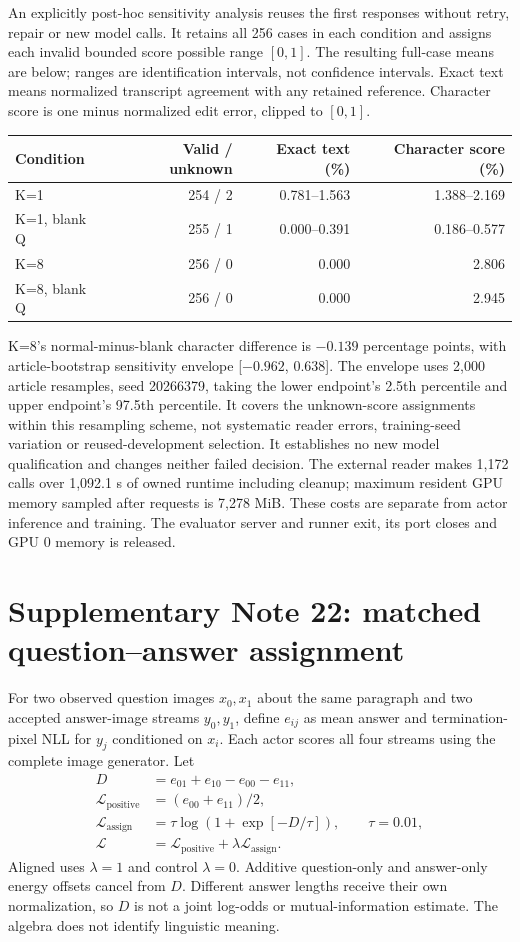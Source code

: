 \documentclass[10pt,a4paper]{article}
\begin{document}
An explicitly post-hoc sensitivity analysis reuses the first responses
without retry, repair or new model calls. It retains all 256 cases in each
condition and assigns each invalid bounded score possible range $[0,1]$.
The resulting full-case means are below; ranges are identification intervals,
not confidence intervals. Exact text means normalized transcript agreement
with any retained reference. Character score is one minus normalized edit
error, clipped to $[0,1]$.
\begin{center}\small
\begin{tabular}{lrrr}\toprule
Condition & Valid / unknown & Exact text (\%) & Character score (\%)\\\midrule
K=1 & 254 / 2 & 0.781--1.563 & 1.388--2.169\\
K=1, blank Q & 255 / 1 & 0.000--0.391 & 0.186--0.577\\
K=8 & 256 / 0 & 0.000 & 2.806\\
K=8, blank Q & 256 / 0 & 0.000 & 2.945\\
\bottomrule\end{tabular}
\end{center}

K=8's normal-minus-blank character difference is $-0.139$ percentage points,
with article-bootstrap sensitivity envelope [$-0.962$, 0.638]. The envelope
uses 2,000 article resamples, seed 20266379, taking the lower endpoint's
2.5th percentile and upper endpoint's 97.5th percentile. It covers the
unknown-score assignments within this resampling scheme, not systematic
reader errors, training-seed variation or reused-development selection.
It establishes no new model qualification and changes neither failed decision.
The external reader makes 1,172 calls over 1,092.1 s of owned runtime including
cleanup; maximum resident GPU memory sampled after requests is 7,278 MiB.
These costs are separate from actor inference and training. The evaluator
server and runner exit, its port closes and GPU 0 memory is released.

\section*{Supplementary Note 22: matched question--answer assignment}
For two observed question images $x_0,x_1$ about the same paragraph and two
accepted answer-image streams $y_0,y_1$, define $e_{ij}$ as mean answer and
termination-pixel NLL for $y_j$ conditioned on $x_i$. Each actor scores all
four streams using the complete image generator. Let
\begin{align}
 D &= e_{01}+e_{10}-e_{00}-e_{11},\\
 \mathcal L_{\mathrm{positive}} &= (e_{00}+e_{11})/2,\\
 \mathcal L_{\mathrm{assign}} &= \tau\log(1+\exp[-D/\tau]),\qquad \tau=0.01,\\
 \mathcal L &= \mathcal L_{\mathrm{positive}}+\lambda\mathcal L_{\mathrm{assign}}.
\end{align}
Aligned uses $\lambda=1$ and control $\lambda=0$. Additive question-only and
answer-only energy offsets cancel from $D$. Different answer lengths receive
their own normalization, so $D$ is not a joint log-odds or mutual-information
estimate. The algebra does not identify linguistic meaning.
\end{document}
